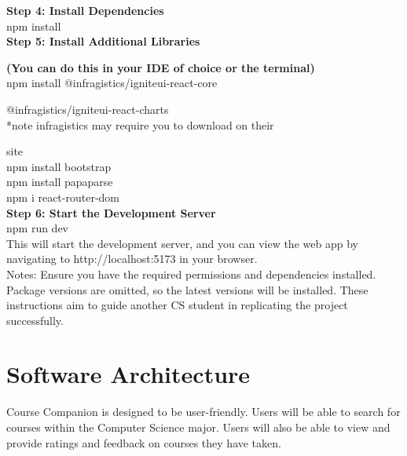 \documentclass[10pt,twocolumn]{article}
\begin{document}
\textbf{Step 4: Install Dependencies}\\

npm install\\


\textbf{Step 5: Install Additional Libraries}

\textbf{(You can do this in your IDE of choice or the terminal)}\\


npm install @infragistics/igniteui-react-core 

@infragistics/igniteui-react-charts\\


*note infragistics may require you to download on their 

site\\


npm install bootstrap\\


npm install papaparse\\

npm i react-router-dom\\


\textbf{Step 6: Start the Development Server}\\


npm run dev\\


This will start the development server, and you can view the web app by navigating to http://localhost:5173 in your browser.\\


Notes:
Ensure you have the required permissions and dependencies installed.
Package versions are omitted, so the latest versions will be installed.
These instructions aim to guide another CS student in replicating the project successfully.


\section{Software Architecture}
Course Companion is designed to be user-friendly. Users will be able to search for courses within the Computer Science major. Users will also be able to view and provide ratings and feedback on courses they have taken.\\
\end{document}
